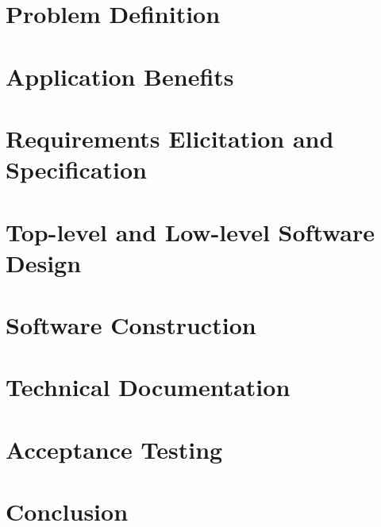 \documentclass[letterpaper, 10 pt, conference]{ieeeconf}
\begin{document}
\thispagestyle{empty}
\pagestyle{empty}


\begin{abstract}
\end{abstract}


\section{Problem Definition}

\section{Application Benefits}

\section{Requirements Elicitation and Specification}

\section{Top-level and Low-level Software Design}

\section{Software Construction}

\section{Technical Documentation}

\section{Acceptance Testing}

\section{Conclusion}


\addtolength{\textheight}{-12cm}





\end{document}
